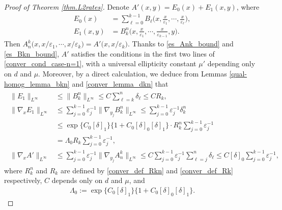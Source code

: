 \documentclass[reqno,12pt]{amsart} %
\theoremstyle{definition}
\theoremstyle{remark}
\numberwithin{equation}{section}
\begin{document}
\begin{proof}[Proof of Theorem \ref{thm.L2rates}]
    Denote $A'(x, y)=E_0(x)+E_1(x, y)$, where
    \begin{align*}
        E_0(x) & =\sum_{\ell=0}^{k-1}B_\ell\Big(x, \frac{x}{\varepsilon_1}, \cdots, \frac{x}{\varepsilon_{\ell}}\Big),\\ E_1(x, y) & =B_k^n\Big(x, \frac{x}{\varepsilon_1}, \cdots, \frac{x}{\varepsilon_{k-1}}, y\Big).
    \end{align*}
    Then $A_n^k\big(x, {x}/{\varepsilon_1}, \cdots, 
    {x}/{\varepsilon_{k}}\big)=A'\big(x, {x}/{\varepsilon_k}\big)$. Thanks to \eqref{es_Ank_bound} and \eqref{es_Bkn_bound}, $A'$ satisfies the conditions in the first two lines of \eqref{conver_cond_case-n=1}, with a universal ellipticity constant $\mu'$ depending only on $d$ and $\mu$. Moreover, by a direct calculation, we deduce from Lemmas \ref{qual-homog_lemma_bkn} and  \ref{conver_lemma_dkn} that
    \begin{align*}%
    \begin{split}
      \|E_1\|_{L^\infty}&\leq \|B_k^n\|_{L^\infty}\leq C\sum_{\ell=k}^n\delta_\ell\leq C R_k,\\
    \|\nabla_x E_1\|_{L^\infty}&\leq \sum_{j=0}^{k-1}\varepsilon_j^{-1}\|\nabla_{y_j}B_k^n\|_{L^\infty}\leq \sum_{j=0}^{k-1}\varepsilon_j^{-1}\delta_k^n\\&\leq \exp\big\{C_0[\delta]_1\big\}\big\{ 1+C_0[\delta]_0[\delta]_1\big\}\cdot R_k^n\sum_{j=0}^{k-1}\varepsilon_j^{-1} \\&=\Lambda_0R_k\sum_{j=0}^{k-1}\varepsilon_j^{-1},\\
    \|\nabla_x A'\|_{L^\infty}&\leq \sum_{j=0}^{k-1}\varepsilon_j^{-1}\|\nabla_{y_j}A_n^k\|_{L^\infty}\leq C\sum_{j=0}^{k-1}\varepsilon_j^{-1}\sum_{\ell=j}^{n}\delta_\ell\leq C[\delta]_0\sum_{j=0}^{k-1}\varepsilon_j^{-1},
    \end{split}
    \end{align*}
    where $R_k^n$ and $R_k$ are defined by \eqref{conver_def_Rkn} and \eqref{conver_def_Rk} respectively, $C$ depends only on $d$ and $\mu$, and 
    \begin{align*}
        \Lambda_0:=\exp\big\{C_0[\delta]_1\big\}\big\{ 1+C_0[\delta]_0[\delta]_1\big\}.
    \end{align*}


\end{proof}
\end{document}
